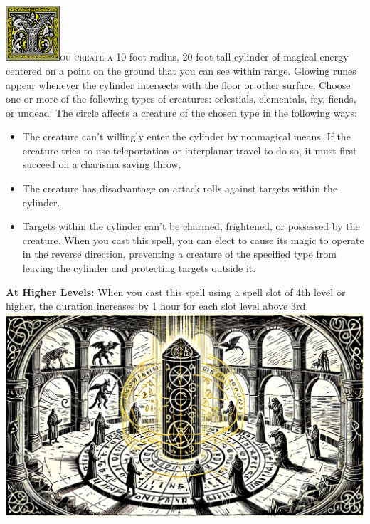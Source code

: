 \documentclass[12pt,showtrims]{memoir}
\begin{document}
\vspace{1\baselineskip}\noindent
\lettrine[lines=4]{\includegraphics[height=58pt]{initials/Y.png}}{ou create a} 10-foot radius, 20-foot-tall cylinder of magical energy centered on a point on the ground that you can see within range. Glowing runes appear whenever the cylinder intersects with the floor or other surface. Choose one or more of the following types of creatures: celestials, elementals, fey, fiends, or undead. The circle affects a creature of the chosen type in the following ways:
\begin{itemize}
    \item The creature can't willingly enter the cylinder by nonmagical means. If the creature tries to use teleportation or interplanar travel to do so, it must first succeed on a charisma saving throw.
    \item The creature has disadvantage on attack rolls against targets within the cylinder.
    \item Targets within the cylinder can't be charmed, frightened, or possessed by the creature. When you cast this spell, you can elect to cause its magic to operate in the reverse direction, preventing a creature of the specified type from leaving the cylinder and protecting targets outside it.
\end{itemize}


\vspace{8pt} \noindent\textbf{At Higher Levels:} When you cast this spell using a spell slot of 4th level or higher, the duration increases by 1 hour for each slot level above 3rd.
\vfill\vfill\noindent
\includegraphics[width=\textwidth]{spell_artwork/magic_circle.png}
\vfill
\newpage
\end{document}
